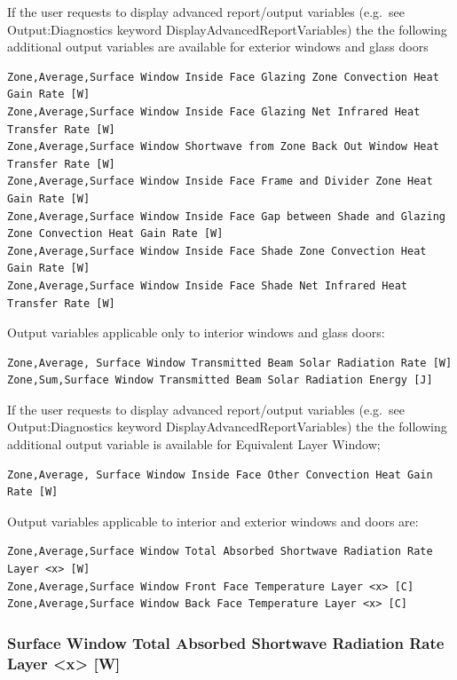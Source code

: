 If the user requests to display advanced report/output variables (e.g.~see Output:Diagnostics keyword DisplayAdvancedReportVariables) the the following additional output variables are available for exterior windows and glass doors

\begin{lstlisting}
Zone,Average,Surface Window Inside Face Glazing Zone Convection Heat Gain Rate [W]
Zone,Average,Surface Window Inside Face Glazing Net Infrared Heat Transfer Rate [W]
Zone,Average,Surface Window Shortwave from Zone Back Out Window Heat Transfer Rate [W]
Zone,Average,Surface Window Inside Face Frame and Divider Zone Heat Gain Rate [W]
Zone,Average,Surface Window Inside Face Gap between Shade and Glazing Zone Convection Heat Gain Rate [W]
Zone,Average,Surface Window Inside Face Shade Zone Convection Heat Gain Rate [W]
Zone,Average,Surface Window Inside Face Shade Net Infrared Heat Transfer Rate [W]
\end{lstlisting}

Output variables applicable only to interior windows and glass doors:

\begin{lstlisting}
Zone,Average, Surface Window Transmitted Beam Solar Radiation Rate [W]
Zone,Sum,Surface Window Transmitted Beam Solar Radiation Energy [J]
\end{lstlisting}

If the user requests to display advanced report/output variables (e.g.~see Output:Diagnostics keyword DisplayAdvancedReportVariables) the the following additional output variable is available for Equivalent Layer Window;

\begin{lstlisting}
Zone,Average, Surface Window Inside Face Other Convection Heat Gain Rate [W]
\end{lstlisting}

Output variables applicable to interior and exterior windows and doors are:

\begin{lstlisting}
Zone,Average,Surface Window Total Absorbed Shortwave Radiation Rate Layer <x> [W]
Zone,Average,Surface Window Front Face Temperature Layer <x> [C]
Zone,Average,Surface Window Back Face Temperature Layer <x> [C]
\end{lstlisting}

\subsubsection{Surface Window Total Absorbed Shortwave Radiation Rate Layer \textless{}x\textgreater{} {[}W{]}}\label{surface-window-total-absorbed-shortwave-radiation-rate-layer-x-w}

